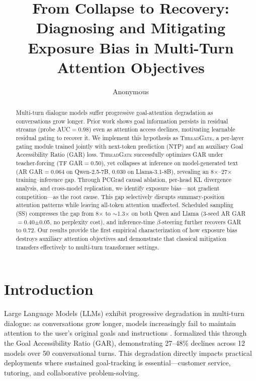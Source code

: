 \documentclass[11pt]{article}
\title{From Collapse to Recovery: Diagnosing and Mitigating\\ Exposure Bias in Multi-Turn Attention Objectives}
\author{Anonymous}
\date{}
\newcommand{\gar}{\textsc{GAR}}
\newcommand{\tg}{\textsc{ThreadGate}}
\begin{document}
\maketitle

\begin{abstract}
Multi-turn dialogue models suffer progressive goal-attention degradation as conversations grow longer. Prior work shows goal information persists in residual streams (probe AUC$=$0.98) even as attention access declines, motivating learnable residual gating to recover it. We implement this hypothesis as \tg{}, a per-layer gating module trained jointly with next-token prediction (NTP) and an auxiliary Goal Accessibility Ratio (\gar{}) loss. \tg{} successfully optimizes \gar{} under teacher-forcing (TF \gar{}$=$0.50), yet collapses at inference on model-generated text (AR \gar{}$=$0.064 on Qwen-2.5-7B, 0.030 on Llama-3.1-8B), revealing an 8$\times$--27$\times$ training--inference gap. Through PCGrad causal ablation, per-head KL divergence analysis, and cross-model replication, we identify exposure bias---not gradient competition---as the root cause. This gap selectively disrupts summary-position attention patterns while leaving all-token attention unaffected. Scheduled sampling (SS) compresses the gap from 8$\times$ to ${\sim}$1.3$\times$ on both Qwen and Llama (3-seed AR \gar{}$=$0.40$\pm$0.05, no perplexity cost), and inference-time $\beta$-steering further recovers \gar{} to 0.72. Our results provide the first empirical characterization of how exposure bias destroys auxiliary attention objectives and demonstrate that classical mitigation transfers effectively to multi-turn transformer settings.
\end{abstract}

\section{Introduction}

Large Language Models (LLMs) exhibit progressive degradation in multi-turn dialogue: as conversations grow longer, models increasingly fail to maintain attention to the user's original goals and instructions \citep{dongre2026goal,liu2024lost,hsieh2024ruler}. \citet{dongre2026goal} formalized this through the Goal Accessibility Ratio (\gar{}), demonstrating 27--48\% declines across 12 models over 50 conversational turns. This degradation directly impacts practical deployments where sustained goal-tracking is essential---customer service, tutoring, and collaborative problem-solving.
\end{document}
